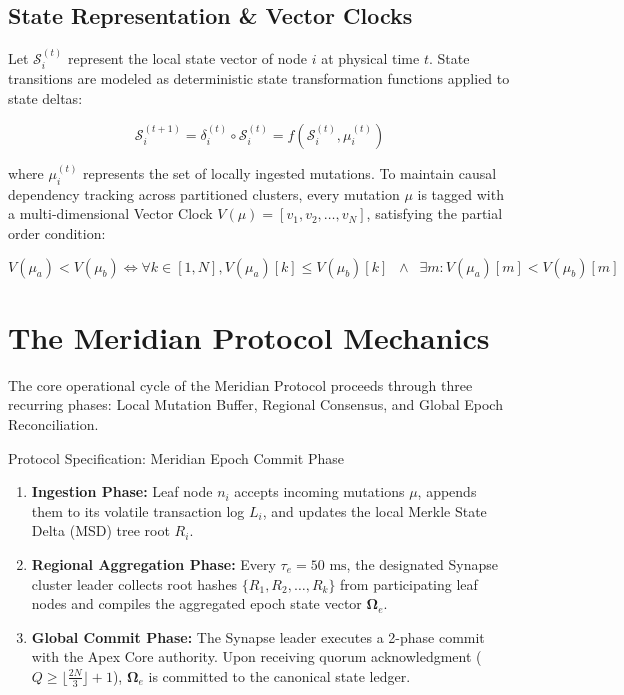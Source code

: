 \documentclass[10pt,a4paper]{article}
\begin{document}
\subsection{State Representation \& Vector Clocks}
Let $\mathcal{S}_i^{(t)}$ represent the local state vector of node $i$ at physical time $t$. State transitions are modeled as deterministic state transformation functions applied to state deltas:

\begin{equation}
  \mathcal{S}_i^{(t+1)} = \delta_{i}^{(t)} \circ \mathcal{S}_i^{(t)} = f\left(\mathcal{S}_i^{(t)}, \mu_{i}^{(t)}\right)
\end{equation}

\noindent
where $\mu_{i}^{(t)}$ represents the set of locally ingested mutations. To maintain causal dependency tracking across partitioned clusters, every mutation $\mu$ is tagged with a multi-dimensional Vector Clock $V(\mu) = [v_1, v_2, \dots, v_N]$, satisfying the partial order condition:

\begin{equation}
  V(\mu_a) < V(\mu_b) \iff \forall k \in [1, N], V(\mu_a)[k] \le V(\mu_b)[k] \;\;\land\;\; \exists m : V(\mu_a)[m] < V(\mu_b)[m]
\end{equation}

\section{The Meridian Protocol Mechanics}
The core operational cycle of the Meridian Protocol proceeds through three recurring phases: Local Mutation Buffer, Regional Consensus, and Global Epoch Reconciliation.

\begin{acmbox}{Protocol Specification: Meridian Epoch Commit Phase}
  \begin{enumerate}[label=\textbf{\arabic*.}]
    \item \textbf{Ingestion Phase:} Leaf node $n_i$ accepts incoming mutations $\mu$, appends them to its volatile transaction log $L_i$, and updates the local Merkle State Delta (MSD) tree root $R_i$.
    \item \textbf{Regional Aggregation Phase:} Every $\tau_e = 50\text{ ms}$, the designated Synapse cluster leader collects root hashes $\{R_1, R_2, \dots, R_k\}$ from participating leaf nodes and compiles the aggregated epoch state vector $\mathbf{\Omega}_e$.
    \item \textbf{Global Commit Phase:} The Synapse leader executes a 2-phase commit with the Apex Core authority. Upon receiving quorum acknowledgment ($Q \ge \lfloor \frac{2N}{3} \rfloor + 1$), $\mathbf{\Omega}_e$ is committed to the canonical state ledger.
  \end{enumerate}
\end{acmbox}
\end{document}
